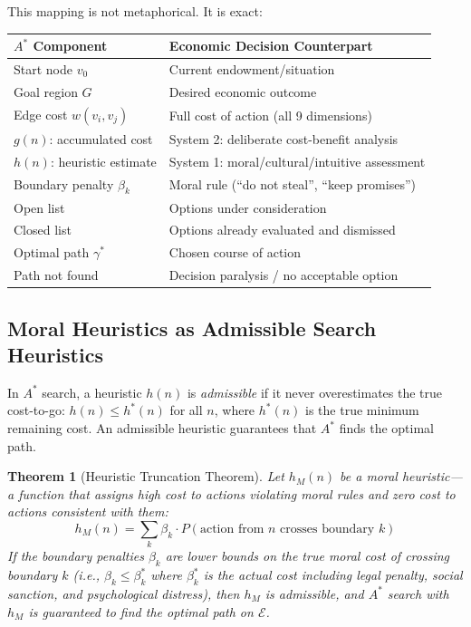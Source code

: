 \documentclass[12pt]{article}
\newtheorem{theorem}{Theorem}[section]
\theoremstyle{definition}
\theoremstyle{remark}
\newcommand{\E}{\mathcal{E}}               %
\begin{document}
This mapping is not metaphorical.  It is exact:

\begin{center}
\begin{tabular}{ll}
\toprule
\textbf{$A^*$ Component} & \textbf{Economic Decision Counterpart} \\
\midrule
Start node $v_0$ & Current endowment/situation \\
Goal region $G$ & Desired economic outcome \\
Edge cost $w(v_i, v_j)$ & Full cost of action (all 9 dimensions) \\
$g(n)$: accumulated cost & System 2: deliberate cost-benefit analysis \\
$h(n)$: heuristic estimate & System 1: moral/cultural/intuitive assessment \\
Boundary penalty $\beta_k$ & Moral rule (``do not steal'', ``keep promises'') \\
Open list & Options under consideration \\
Closed list & Options already evaluated and dismissed \\
Optimal path $\gamma^*$ & Chosen course of action \\
Path not found & Decision paralysis / no acceptable option \\
\bottomrule
\end{tabular}
\end{center}

\subsection{Moral Heuristics as Admissible Search Heuristics}

In $A^*$ search, a heuristic $h(n)$ is \emph{admissible} if it never overestimates the true cost-to-go: $h(n) \leq h^*(n)$ for all $n$, where $h^*(n)$ is the true minimum remaining cost.  An admissible heuristic guarantees that $A^*$ finds the optimal path.

\begin{theorem}[Heuristic Truncation Theorem]
\label{thm:heuristic_truncation}
Let $h_M(n)$ be a \emph{moral heuristic}---a function that assigns high cost to actions violating moral rules and zero cost to actions consistent with them:
\begin{equation}
h_M(n) = \sum_{k} \beta_k \cdot P(\text{action from } n \text{ crosses boundary } k)
\label{eq:moral_heuristic}
\end{equation}
If the boundary penalties $\beta_k$ are lower bounds on the true moral cost of crossing boundary $k$ (i.e., $\beta_k \leq \beta_k^*$ where $\beta_k^*$ is the actual cost including legal penalty, social sanction, and psychological distress), then $h_M$ is \emph{admissible}, and $A^*$ search with $h_M$ is guaranteed to find the optimal path on $\E$.
\end{theorem}
\end{document}
